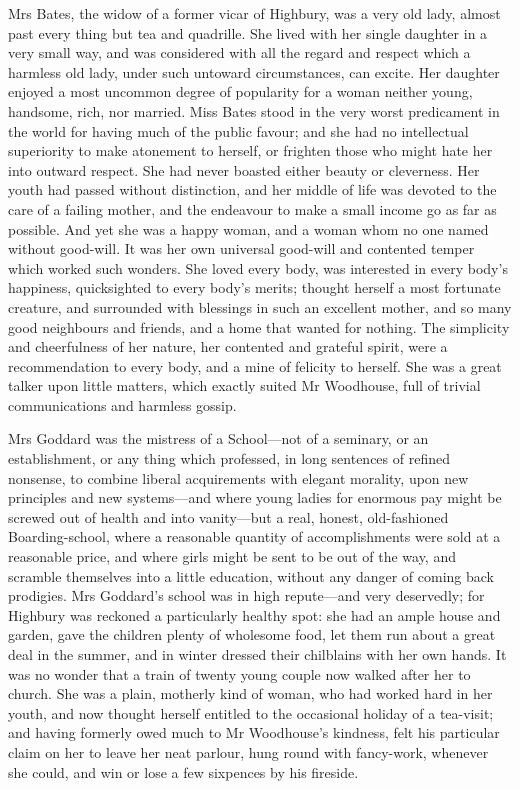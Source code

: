Mrs Bates, the widow of a former vicar of Highbury, was a very old lady, almost past every thing but tea and quadrille. She lived with her single daughter in a very small way, and was considered with all the regard and respect which a harmless old lady, under such untoward circumstances, can excite. Her daughter enjoyed a most uncommon degree of popularity for a woman neither young, handsome, rich, nor married. Miss Bates stood in the very worst predicament in the world for having much of the public favour; and she had no intellectual superiority to make atonement to herself, or frighten those who might hate her into outward respect. She had never boasted either beauty or cleverness. Her youth had passed without distinction, and her middle of life was devoted to the care of a failing mother, and the endeavour to make a small income go as far as possible. And yet she was a happy woman, and a woman whom no one named without good-will. It was her own universal good-will and contented temper which worked such wonders. She loved every body, was interested in every body's happiness, quicksighted to every body's merits; thought herself a most fortunate creature, and surrounded with blessings in such an excellent mother, and so many good neighbours and friends, and a home that wanted for nothing. The simplicity and cheerfulness of her nature, her contented and grateful spirit, were a recommendation to every body, and a mine of felicity to herself. She was a great talker upon little matters, which exactly suited Mr Woodhouse, full of trivial communications and harmless gossip.

Mrs Goddard was the mistress of a School—not of a seminary, or an establishment, or any thing which professed, in long sentences of refined nonsense, to combine liberal acquirements with elegant morality, upon new principles and new systems—and where young ladies for enormous pay might be screwed out of health and into vanity—but a real, honest, old-fashioned Boarding-school, where a reasonable quantity of accomplishments were sold at a reasonable price, and where girls might be sent to be out of the way, and scramble themselves into a little education, without any danger of coming back prodigies. Mrs Goddard's school was in high repute—and very deservedly; for Highbury was reckoned a particularly healthy spot: she had an ample house and garden, gave the children plenty of wholesome food, let them run about a great deal in the summer, and in winter dressed their chilblains with her own hands. It was no wonder that a train of twenty young couple now walked after her to church. She was a plain, motherly kind of woman, who had worked hard in her youth, and now thought herself entitled to the occasional holiday of a tea-visit; and having formerly owed much to Mr Woodhouse's kindness, felt his particular claim on her to leave her neat parlour, hung round with fancy-work, whenever she could, and win or lose a few sixpences by his fireside.

